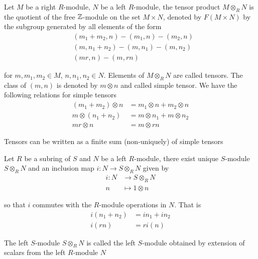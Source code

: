 \begin{definition}
	Let $M$ be a right $R$-module, $N$ be a left $R$-module, the tensor product $M \otimes_R N$ is the quotient of the free $\mathbb{Z}$-module on the set $M \times N$, denoted by $F(M \times N)$ by the subgroup generated by all elements of the form
	\begin{align*}
		&(m_1 + m_2, n) - (m_1, n) - (m_2, n) \\
		&(m, n_1 + n_2) - (m, n_1) - (m, n_2) \\
		&(mr, n) - (m, rn)
	\end{align*}
	
	for $m, m_1, m_2 \in M$, $n, n_1, n_2 \in N$. Elements of $M \otimes_R N$ are called tensors. The class of $(m, n)$ is denoted by $m \otimes n$ and called simple tensor. We have the following relations for simple tensors
	\begin{align*}
		(m_1 + m_2) \otimes n &= m_1 \otimes n + m_2 \otimes n \\
		m \otimes (n_1 + n_2) &= m \otimes n_1 + m \otimes n_2 \\
		mr \otimes n &= m \otimes rn
	\end{align*}
	
	Tensors can be written as a finite sum (non-uniquely) of simple tensors
\end{definition}

\begin{proposition}
	Let $R$ be a subring of $S$ and $N$ be a left $R$-module, there exist unique $S$-module $S \otimes_R N$ and an inclusion map $i: N \to S \otimes_R N$ given by
	\begin{align*}
		i: N &\to S \otimes_R N \\
			n &\mapsto 1 \otimes n
	\end{align*}
	
	so that $i$ commutes with the $R$-module operations in $N$. That is
	\begin{align*}
		i (n_1 + n_2) &= i n_1 + i n_2 \\
		i (r n) &= r i(n)
	\end{align*}
	
	The left $S$-module $S \otimes_R N$ is called the left $S$-module obtained by extension of scalars from the left $R$-module $N$
	
\end{proposition}

